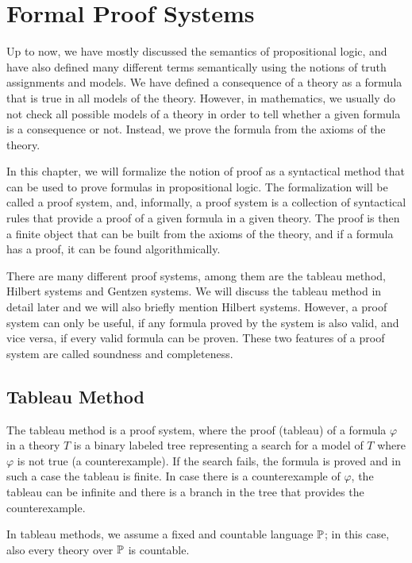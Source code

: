 \chapter{Formal Proof Systems}

Up to now, we have mostly discussed the semantics of propositional logic, and have also defined many different terms semantically using the notions of truth assignments and models. We have defined a consequence of a theory as a formula that is true in all models of the theory. However, in mathematics, we usually do not check all possible models of a theory in order to tell whether a given formula is a consequence or not. Instead, we prove the formula from the axioms of the theory. 

In this chapter, we will formalize the notion of proof as a syntactical method that can be used to prove formulas in propositional logic. The formalization will be called a proof system, and, informally, a proof system is a collection of syntactical rules that provide a proof of a given formula in a given theory. The proof is then a finite object that can be built from the axioms of the theory, and if a formula has a proof, it can be found algorithmically. 

There are many different proof systems, among them are the tableau method, Hilbert systems and Gentzen systems. We will discuss the tableau method in detail later and we will also briefly mention Hilbert systems. However, a proof system can only be useful, if any formula proved by the system is also valid, and vice versa, if every valid formula can be proven. These two features of a proof system are called soundness and completeness. 

\section{Tableau Method}

The tableau method is a proof system, where the proof (tableau) of a formula $\varphi$ in a theory $T$ is a binary labeled tree representing a search for a model of $T$ where $\varphi$ is not true (a counterexample). If the search fails, the formula is proved and in such a case the tableau is finite. In case there is a counterexample of $\varphi$, the tableau can be infinite and there is a branch in the tree that provides the counterexample.

In tableau methods, we assume a fixed and countable language $\mathbb{P}$; in this case, also every theory over $\mathbb{P}$ is countable.

